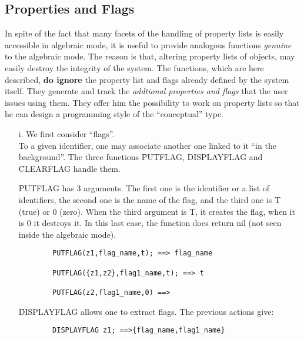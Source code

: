 \subsection{Properties and Flags}
In spite of the fact that many facets of the handling of
property lists is easily accessible in algebraic mode, it is useful to
provide analogous functions {\em genuine} to the algebraic mode. The reason is
that, altering property lists of objects, may easily destroy the integrity
of the system. The functions, which are here described, {\bf do ignore}
the property list and flags already defined by the system itself. They
generate and track the {\em addtional properties and flags} that the user
issues using them. They offer him
the  possibility to work on property lists so
that he can design a programming style of the ``conceptual'' type.
\begin{itemize}
\item[i.] We first consider ``flags''. \\
To a given identifier, one may
associate another one linked to it ``in the background''. The  three
functions \f{PUTFLAG, DISPLAYFLAG} and \f{CLEARFLAG} handle them.

\f{PUTFLAG} has 3 arguments. The first one is the identifier or a list
of identifiers, the second one is the name of the flag,
and the third one is T (true) or 0 (zero).
When the third argument is T, it creates the flag, when it is 0 it
destroys it. In this last case, the function does return nil (not seen 
inside the algebraic mode).
\begin{verbatim}
        PUTFLAG(z1,flag_name,t); ==> flag_name

        PUTFLAG({z1,z2},flag1_name,t); ==> t

        PUTFLAG(z2,flag1_name,0) ==>
\end{verbatim}
\f{DISPLAYFLAG} allows one to extract flags. The previous actions give:
\begin{verbatim}
        DISPLAYFLAG z1; ==>{flag_name,flag1_name}


\end{verbatim}
\end{itemize}
